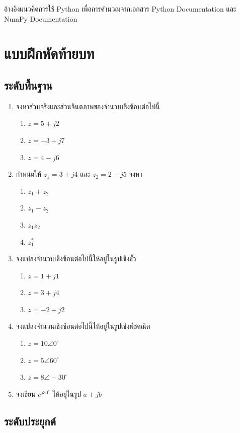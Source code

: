 อ้างอิงแนวคิดการใช้ Python เพื่อการคำนวณจากเอกสาร Python Documentation และ NumPy Documentation

\section{แบบฝึกหัดท้ายบท}

\subsection{ระดับพื้นฐาน}

\begin{enumerate}
\item จงหาส่วนจริงและส่วนจินตภาพของจำนวนเชิงซ้อนต่อไปนี้
  \begin{enumerate}
  \item $z=5+j2$
  \item $z=-3+j7$
  \item $z=4-j6$
  \end{enumerate}
\item กำหนดให้ $z_1=3+j4$ และ $z_2=2-j5$ จงหา
  \begin{enumerate}
  \item $z_1+z_2$
  \item $z_1-z_2$
  \item $z_1z_2$
  \item $z_1^*$
  \end{enumerate}
\item จงแปลงจำนวนเชิงซ้อนต่อไปนี้ให้อยู่ในรูปเชิงขั้ว
  \begin{enumerate}
  \item $z=1+j1$
  \item $z=3+j4$
  \item $z=-2+j2$
  \end{enumerate}
\item จงแปลงจำนวนเชิงซ้อนต่อไปนี้ให้อยู่ในรูปเชิงพีชคณิต
  \begin{enumerate}
  \item $z=10\angle0^\circ$
  \item $z=5\angle60^\circ$
  \item $z=8\angle-30^\circ$
  \end{enumerate}
\item จงเขียน $e^{j30^\circ}$ ให้อยู่ในรูป $a+jb$
\end{enumerate}

\subsection{ระดับประยุกต์}

